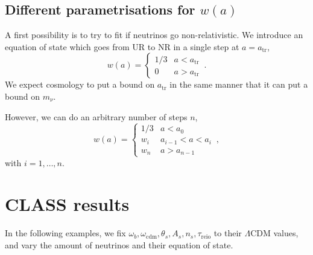 \subsection{Different parametrisations for $w(a)$}
A first possibility is to try to fit if neutrinos go non-relativistic. We introduce an equation of state which goes from UR to NR in a single step at $a = a_{\text{tr}}$,
\begin{equation}\label{eq:one-step-eos}
    w(a) = \begin{cases}
        1/3 & a < a_{\text{tr}}\\ 0 & a > a_{\text{tr}}
    \end{cases}\, .
\end{equation}We expect cosmology to put a bound on $a_{\text{tr}}$ in the same manner that it can put a bound on $m_\nu$. 

However, we can do an arbitrary number of steps $n$,
\begin{equation}
    w(a) = \begin{cases}
        1/3 & a < a_{0}\\ w_{i} & a_{i-1} < a < a_{i} \\ w_{n} & a > a_{n-1}
    \end{cases}\, ,
\end{equation}with $i = 1, \ldots, n$.

\section{CLASS results}
In the following examples, we fix $\omega_b, \omega_{\mathrm{cdm}}, \theta_s, A_s, n_s, \tau_{\mathrm{reio}}$ to their $\Lambda$CDM values, and vary the amount of neutrinos and their equation of state. 

